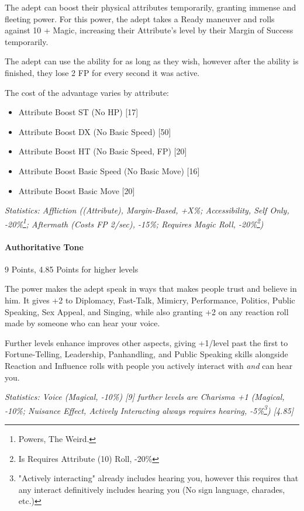 \begin{multicols}{3}
	The adept can boost their physical attributes temporarily, granting immense and fleeting power. For this power, the adept takes a Ready maneuver and rolls against 10 + Magic, increasing their Attribute's level by their Margin of Success temporarily. 
	
	The adept can use the ability for as long as they wish, however after the ability is finished, they lose 2 FP for every second it was active.
	
	The cost of the advantage varies by attribute:
	
	\begin{itemize}
		\itemsep 0pt
		\item Attribute Boost ST (No HP) [17]
		\item Attribute Boost DX (No Basic Speed) [50]
		\item Attribute Boost HT (No Basic Speed, FP) [20]
		\item Attribute Boost Basic Speed (No Basic Move) [16]
		\item Attribute Boost Basic Move [20]
	\end{itemize}
	
	\textcolor{OliveGreen}{\textit{Statistics: Affliction ((Attribute), Margin-Based, +X\%; Accessibility, Self Only, -20\%\footnote{\GURPS Powers, The Weird.}; Aftermath (Costs FP 2/sec), -15\%; Requires Magic Roll, -20\%\footnote{Is Requires Attribute (10) Roll, -20\%}) }}
	
	\paragraph{Authoritative Tone}
	\begin{flushright}
		9 Points, 4.85 Points for higher levels
	\end{flushright}
			
	The power makes the adept speak in ways that makes people trust and believe in him. It gives +2 to Diplomacy, Fast-Talk, Mimicry, Performance, Politics, Public Speaking, Sex Appeal, and Singing, while also granting +2 on any reaction roll made by someone who can hear your voice.
	
	Further levels enhance improves other aspects, giving +1/level past the first to Fortune-Telling, Leadership, Panhandling, and Public Speaking skills alongside Reaction and Influence rolls with people you actively interact with \textit{and} can hear you.
			
	\textcolor{OliveGreen}{\textit{Statistics: Voice (Magical, -10\%) [9] further levels are Charisma +1 (Magical, -10\%; Nuisance Effect, Actively Interacting always requires hearing, -5\%\footnote{"Actively interacting" already includes hearing you, however this requires that any interact definitively includes hearing you (No sign language, charades, etc.)}) [4.85]}}
			

\end{multicols}
